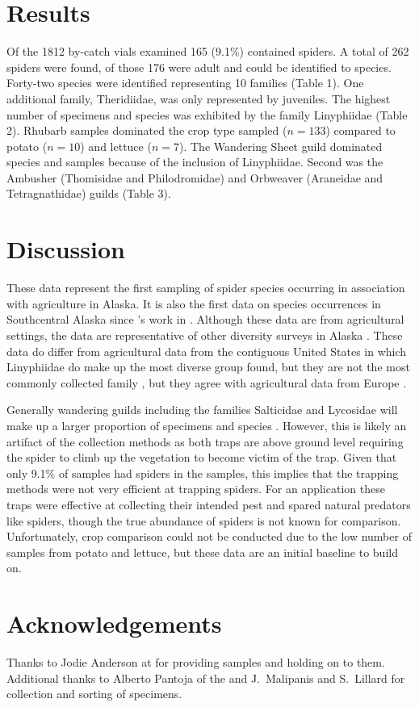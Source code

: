 \section{Results}
Of the 1812 by-catch vials examined 165 (9.1\%) contained spiders. A total of 262 spiders were found, of those 176 were adult and could be identified to species. Forty-two species were identified representing 10 families (Table 1). One additional family, Theridiidae, was only represented by juveniles. The highest number of specimens and species was exhibited by the family Linyphiidae (Table 2). Rhubarb samples dominated the crop type sampled ($n=133$) compared to potato ($n=10$) and lettuce ($n=7$). The Wandering Sheet guild dominated species and samples because of the inclusion of Linyphiidae. Second was the Ambusher (Thomisidae and Philodromidae) and Orbweaver (Araneidae and Tetragnathidae) guilds (Table 3). 

\section{Discussion}

These data represent the first sampling of spider species occurring in association with agriculture in Alaska. It is also the first data on species occurrences in Southcentral Alaska since \citeauthor{ChamberlinIvie1947}’s work in \citeyear{ChamberlinIvie1947}. Although these data are from agricultural settings, the data are representative of other diversity surveys in Alaska \citep{Slowik2006, SlowikBlagoev2012, Sikesetal2013}.  These data do differ from agricultural data from the contiguous United States in which Linyphiidae do make up the most diverse group found, but they are not the most commonly collected family \citep{YoungEdwards1990}, but they agree with agricultural data from Europe \citep{NyffelerBirkhofer2017}. 

Generally wandering guilds including the families Salticidae and Lycosidae will make up a larger proportion of specimens and species \citep{YoungEdwards1990, Kerzicniketal2013}. However, this is likely an artifact of the collection methods as both traps are above ground level requiring the spider to climb up the vegetation to become victim of the trap. Given that only 9.1\% of samples had spiders in the samples, this implies that the trapping methods were not very efficient at trapping spiders. For an  application these traps were effective at collecting their intended pest and spared natural predators like spiders, though the true abundance of spiders is not known for comparison. Unfortunately, crop comparison could not be conducted due to the low number of samples from potato and lettuce, but these data are an initial baseline to build on. 

\section{Acknowledgements}

Thanks to Jodie Anderson at  for providing samples and holding on to them. Additional thanks to Alberto Pantoja of the  and J.\ Malipanis and S.\ Lillard for collection and sorting of specimens. 


